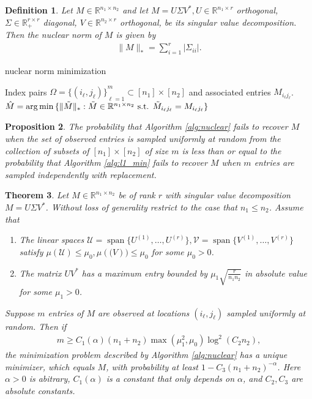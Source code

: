 \documentclass[13pt]{article}
\newtheorem{thm}{Theorem}[section]
\newtheorem{prop}[thm]{Proposition}
\theoremstyle{plain}
\newtheorem{defi}[thm]{Definition}
\newcommand{\R}{\mathbb{R}}
\newcommand{\set}[1]{{\{#1\}}}
\DeclareMathOperator{\argmin}{\arg\min}
\DeclareMathOperator{\mspan}{span}
\newcommand{\til}{\ensuremath{\tilde}}
\begin{document}
\begin{defi}
    Let $M \in \R^{n_1 \times n_2}$ and let $M = U \Sigma V^\ast, U \in \R^{n_1 \times r}$ orthogonal,
    $\Sigma \in \R_+^{r \times r}$ diagonal, $V \in \R^{n_2 \times r}$ orthogonal, be its
    singular value decomposition. Then the \emph{nuclear norm} of $M$ is given by
    \[
        \begin{aligned}
            \|M\|_\ast = \sum_{i=1}^{r} |\Sigma_{ii}|.
        \end{aligned}
    \] 
\end{defi} 

\begin{algorithm}
\caption{nuclear norm minimization}\label{alg:nuclear}
\begin{algorithmic}
    \Require Index pairs $\Omega = \set{(i_\ell,j_\ell)}_{\ell=1}^m \subset [n_1] \times [n_2]$
        and associated entries $M_{i_\ell j_{\ell}}$.
    \State \Return $\hat{M} = \argmin\set{\|\til{M}\|_\ast : \til{M} \in \R^{n_1 \times n_2} \text{ s.t. } \til{M}_{i_\ell j_\ell} = M_{i_\ell j_\ell}}$
\end{algorithmic}
\end{algorithm}

\begin{prop}
    The probability that Algorithm \ref{alg:nuclear} fails to recover $M$ when
    the set of observed entries is sampled uniformly at random
    from the collection of subsets of $[n_1] \times [n_2]$ of size $m$
    is less than or equal to the probability that Algorithm \ref{alg:l1_min}
    fails to recover $M$ when $m$ entries are sampled independently with replacement.
\end{prop}

\begin{thm}
    Let $M \in \R^{n_1 \times n_2}$ be of rank $r$ with singular value decomposition
    $M = U\Sigma V^\ast$. Without loss of generality restrict to the case that
    $n_1 \le n_2$. Assume that
    \begin{enumerate}[label=(A\arabic*), start=0]
        \item The linear spaces $\mathcal{U} = \mspan\set{U^{(1)}, \ldots, U^{(r)}}, \mathcal{V} = \mspan\set{V^{(1)}, \ldots, V^{(r)}}$
            satisfy $\mu(\mathcal{U}) \le \mu_0, \mu(\mathcal(V)) \le \mu_0$ for some $\mu_0 > 0$.
        \item The matrix $UV^\ast$ has a maximum entry bounded by $\mu_1\sqrt{\frac{r}{n_1n_2}}$ in absolute value
            for some $\mu_1 > 0$.
    \end{enumerate}
    Suppose $m$ entries of $M$ are observed at locations $(i_{\ell}, j_\ell)$ sampled uniformly at random.
    Then if
    \[
        \begin{aligned}
            m \ge C_1(\alpha) (n_1 + n_2) \max(\mu_1^2,\mu_0) \log^2(C_2n_2),
        \end{aligned}
    \]
    the minimization problem described by Algorithm \ref{alg:nuclear} has a unique
    minimizer, which equals $M$, with probability at least $1 - C_3(n_1 + n_2)^{-\alpha}$.
    Here $\alpha > 0$ is abitrary, $C_1(\alpha)$ is a constant that only depends on $\alpha$,
    and $C_2,C_3$ are absolute constants.
\end{thm}

\newpage

\printbibliography[heading=bibintoc]
\end{document}
